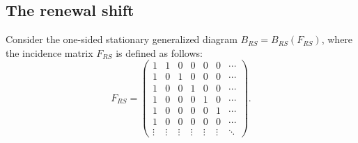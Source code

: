 \documentclass[11pt, twoside]{amsart}
\theoremstyle{definition}
\theoremstyle{remark}
\theoremstyle{plain}
\numberwithin{equation}{section}
\begin{document}
    
    
     
    
    
    
     
     
    
    
    


\subsection{The renewal shift}\label{subsec:BD_renewal}

Consider the one-sided stationary generalized diagram $B_{RS} = B_{RS}(F_{RS})$, 
where the incidence matrix $F_{RS}$ is defined as follows:
\begin{equation}
    F_{RS} = \begin{pmatrix}
    1 & 1 & 0 & 0 & 0 & 0 & \cdots\\
    1 & 0 & 1 & 0 & 0 & 0 & \cdots\\
    1 & 0 & 0 & 1 & 0 & 0 & \cdots\\
    1 & 0 & 0 & 0 & 1 & 0 & \cdots\\
    1 & 0 & 0 & 0 & 0 & 1 & \cdots\\
    1 & 0 & 0 & 0 & 0 & 0 & \cdots\\
   \vdots & \vdots & \vdots & \vdots & \vdots & \vdots & \ddots
    \end{pmatrix}.
\end{equation}
\end{document}
